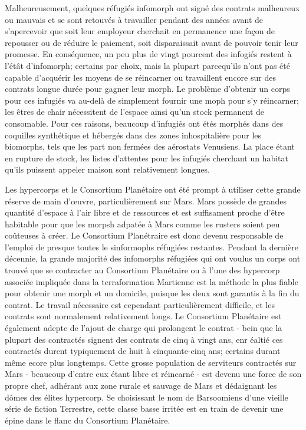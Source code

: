 Malheureusement, quelques réfugiés infomorph ont signé des contrats malheureux ou mauvais et se sont retouvés à travailler pendant des années avant de s'apercevoir que soit leur employeur cherchait en permanence une façon de repousser ou de réduire le paiement, soit disparaissait avant de pouvoir tenir leur promesse. En conséquence, un peu plus de vingt pourcent des infogiés restent à l'étât d'infomorph; certains par choix, mais la plupart parcequ'ils n'ont pas été capable d'acquérir les moyens de se réincarner ou travaillent encore sur des contrats longue durée pour gagner leur morph. Le problème d'obtenir un corps pour ces infugiés va au-delà de simplement fournir une moph pour s'y réincarner; les êtres de chair nécessitent de l'espace ainsi qu'un stock permanent de consomable. Pour ces raisons, beaucoup d'infugiés ont étés morphés dans des coquilles synthétique et hébergés dans des zones inhospitalière pour les biomorphs, tels que les part non fermées des aérostats Venusiens. La place étant en rupture de stock, les listes d'attentes pour les infugiés cherchant un habitat qu'ils puissent appeler maison sont relativement longues. 

Les hypercorps et le Consortium Planétaire ont été prompt à utiliser cette grande réserve de main d'œuvre, particulièrement sur Mars. Mars possède de grandes quantité d'espace à l'air libre et de ressources et est suffisament proche d'être habitable pour que les morpsh adpatée à Mars comme les rusters soient peu coûteuses à créer. Le Consortium Planétraire est donc devenu responsable de l'emploi de presque toutes le sinformophs réfugiées restantes. Pendant la dernière décennie, la grande majorité des infomorphs réfugiées qui ont voulus un corps ont trouvé que se contracter au Consortium Planétaire ou à l'une des hypercorp associée impliquée dans la terraformation Martienne  est la méthode la plus fiable pour obtenir une morph et un domicile, puisque les deux sont garantis à la fin du contrat. Le travail nécessaire est cependant particulièrement difficile, et les contrats sont normalement relativement longs. Le Consortium Planétaire est également adepte de l'ajout de charge qui prolongent le contrat - bein que la plupart des contractés signent des contrats de cinq à vingt ans, enr éaltié ces contractés durent typiquement de huit à cinquante-cinq ans; certains durant même ecore plus longtemps. Cette grosse population de serviteurs contractés sur Mars - beaucoup d'entre eux étant libre et réincarné - est devenu une force de son propre chef, adhérant aux zone rurale et sauvage de Mars et dédaignant les dômes des élites hypercorp. Se choisissant le nom de Barsoomiens d'une vieille série de fiction Terrestre, cette classe basse irritée est en train de devenir une épine dans le flanc du Consortium Planétaire. 

